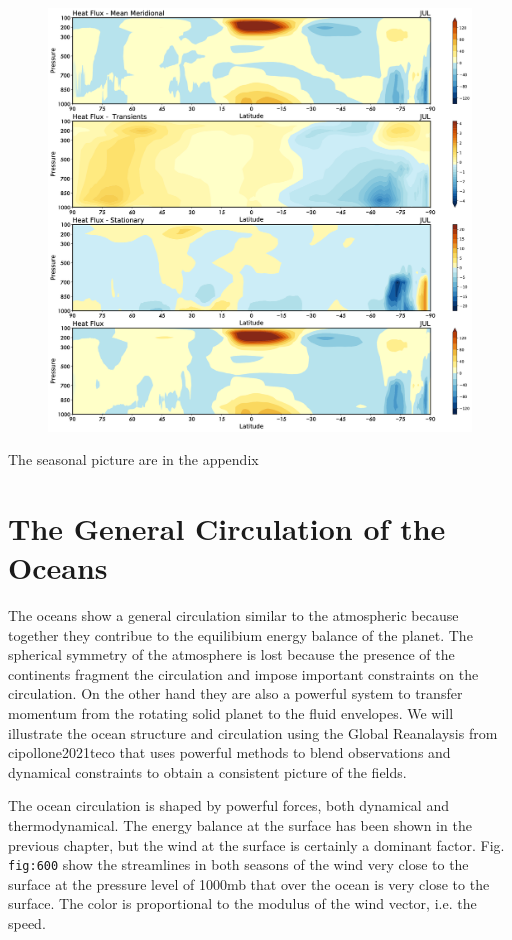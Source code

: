 \begin{figure}
\centering
\includegraphics[width = .7 \textwidth]{figs/GD/JULTVFlux.png}
\caption{}\label{}
\end{figure}

The seasonal picture are in the appendix

\section{The General Circulation of the
Oceans}\label{the-general-circulation-of-the-oceans}

The oceans show a general circulation similar to the atmospheric because
together they contribue to the equilibium energy balance of the planet.
The spherical symmetry of the atmosphere is lost because the presence of
the continents fragment the circulation and impose important constraints
on the circulation. On the other hand they are also a powerful system to
transfer momentum from the rotating solid planet to the fluid envelopes.
We will illustrate the ocean structure and circulation using the Global
Reanalaysis from cipollone2021teco that uses powerful methods to blend
observations and dynamical constraints to obtain a consistent picture of
the fields.

The ocean circulation is shaped by powerful forces, both dynamical and
thermodynamical. The energy balance at the surface has been shown in the
previous chapter, but the wind at the surface is certainly a dominant
factor. Fig. \texttt{fig:600} show the streamlines in both seasons of
the wind very close to the surface at the pressure level of 1000mb that
over the ocean is very close to the surface. The color is proportional
to the modulus of the wind vector, i.e. the speed.

